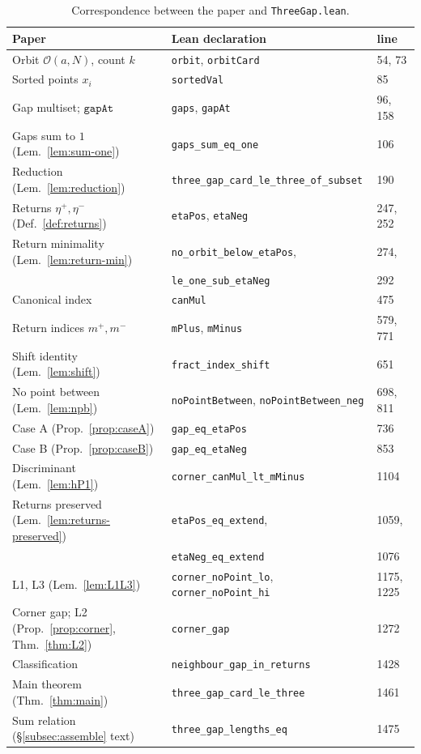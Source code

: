 \documentclass[11pt,reqno]{amsart}
\theoremstyle{plain}
\theoremstyle{definition}
\theoremstyle{remark}
\newcommand{\etap}{\eta^{+}}
\newcommand{\etam}{\eta^{-}}
\newcommand{\mpl}{m^{+}}
\newcommand{\mmi}{m^{-}}
\newcommand{\orb}{\mathcal{O}}
\newcommand{\code}[1]{\texttt{#1}}
\begin{document}
\begin{table}[ht]
\centering
\setlength{\tabcolsep}{4.5pt}
\begin{tabular}{lll}
\hline
Paper & Lean declaration & line\\
\hline
Orbit $\orb(a,N)$, count $k$        & \code{orbit}, \code{orbitCard}            & 54, 73\\
Sorted points $x_i$                 & \code{sortedVal}                          & 85\\
Gap multiset; $\code{gapAt}$        & \code{gaps}, \code{gapAt}                 & 96, 158\\
Gaps sum to $1$ (Lem.~\ref{lem:sum-one}) & \code{gaps\_sum\_eq\_one}            & 106\\
Reduction (Lem.~\ref{lem:reduction})& \code{three\_gap\_card\_le\_three\_of\_subset} & 190\\
Returns $\etap,\etam$ (Def.~\ref{def:returns}) & \code{etaPos}, \code{etaNeg}   & 247, 252\\
Return minimality (Lem.~\ref{lem:return-min}) & \code{no\_orbit\_below\_etaPos}, & 274,\\
                                    & \quad\code{le\_one\_sub\_etaNeg}          & 292\\
Canonical index                     & \code{canMul}                             & 475\\
Return indices $\mpl,\mmi$          & \code{mPlus}, \code{mMinus}               & 579, 771\\
Shift identity (Lem.~\ref{lem:shift})& \code{fract\_index\_shift}               & 651\\
No point between (Lem.~\ref{lem:npb})& \code{noPointBetween}, \code{noPointBetween\_neg} & 698, 811\\
Case A (Prop.~\ref{prop:caseA})     & \code{gap\_eq\_etaPos}                     & 736\\
Case B (Prop.~\ref{prop:caseB})     & \code{gap\_eq\_etaNeg}                     & 853\\
Discriminant (Lem.~\ref{lem:hP1})   & \code{corner\_canMul\_lt\_mMinus}         & 1104\\
Returns preserved (Lem.~\ref{lem:returns-preserved}) & \code{etaPos\_eq\_extend}, & 1059,\\
                                    & \quad\code{etaNeg\_eq\_extend}            & 1076\\
L1, L3 (Lem.~\ref{lem:L1L3})        & \code{corner\_noPoint\_lo}, \code{corner\_noPoint\_hi} & 1175, 1225\\
Corner gap; L2 (Prop.~\ref{prop:corner}, Thm.~\ref{thm:L2}) & \code{corner\_gap} & 1272\\
Classification                      & \code{neighbour\_gap\_in\_returns}        & 1428\\
Main theorem (Thm.~\ref{thm:main})  & \code{three\_gap\_card\_le\_three}        & 1461\\
Sum relation (\S\ref{subsec:assemble} text) & \code{three\_gap\_lengths\_eq}    & 1475\\
\hline
\end{tabular}
\caption{Correspondence between the paper and \code{ThreeGap.lean}.}
\label{tab:correspondence}
\end{table}
\end{document}
